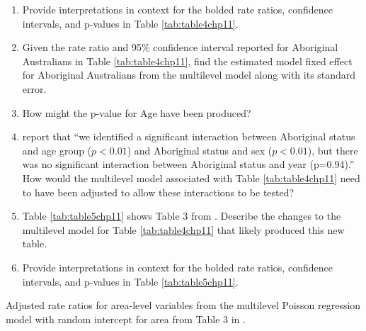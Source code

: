 \documentclass[
]{krantz}
\begin{document}
\begin{enumerate}
\def\labelenumi{\arabic{enumi}.}
\setcounter{enumi}{20}
\item
  Provide interpretations in context for the bolded rate ratios, confidence intervals, and p-values in Table \ref{tab:table4chp11}.
\item
  Given the rate ratio and 95\% confidence interval reported for Aboriginal Australians in Table \ref{tab:table4chp11}, find the estimated model fixed effect for Aboriginal Australians from the multilevel model along with its standard error.
\item
  How might the p-value for Age have been produced?
\item
  \citet{Randall2014} report that ``we identified a significant interaction between Aboriginal status and age group (\(p<0.01\)) and Aboriginal status and sex (\(p<0.01\)), but there was no significant interaction between Aboriginal status and year (p=0.94).'' How would the multilevel model associated with Table \ref{tab:table4chp11} need to have been adjusted to allow these interactions to be tested?
\item
  Table \ref{tab:table5chp11} shows Table 3 from \citet{Randall2014}. Describe the changes to the multilevel model for Table \ref{tab:table4chp11} that likely produced this new table.
\item
  Provide interpretations in context for the bolded rate ratios, confidence intervals, and p-values in Table \ref{tab:table5chp11}.
\end{enumerate}

\label{tab:table5chp11} Adjusted rate ratios for area-level variables from the multilevel Poisson regression model with random intercept for area from Table 3 in \citet{Randall2014}.
\end{document}
